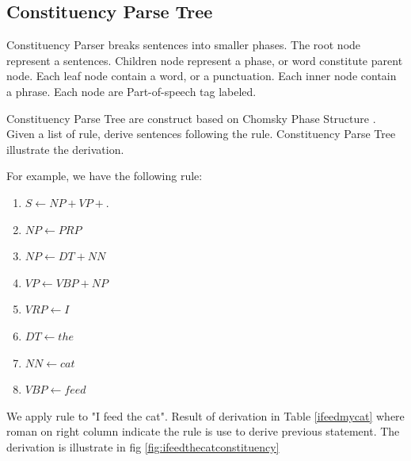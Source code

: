 \subsection{Constituency Parse Tree}
Constituency Parser breaks sentences into smaller phases. The root node represent a sentences. Children node represent a phase, or word constitute parent node. Each leaf node contain a word, or a punctuation. Each inner node contain a phrase. Each node are Part-of-speech tag labeled.

Constituency Parse Tree are construct based on Chomsky Phase Structure \cite{chomsky2002syntactic}. Given a list of rule, derive sentences following the rule. Constituency Parse Tree illustrate the derivation.


For example, we have the following rule:
\begin{enumerate}[label=(\roman*)]
	\item $S \leftarrow NP + VP + .$
	\item $NP \leftarrow PRP $
	\item $NP \leftarrow DT + NN$
	\item $VP \leftarrow VBP + NP$
	\item $VRP \leftarrow I$
	\item $DT \leftarrow the$
	\item $NN \leftarrow cat$
	\item $VBP \leftarrow feed$
\end{enumerate}
We apply rule to "I feed the cat". Result of derivation in Table \ref{ifeedmycat}  where roman on right column indicate the rule is use to derive previous statement. The derivation is illustrate in fig \ref{fig:ifeedthecatconstituency}

